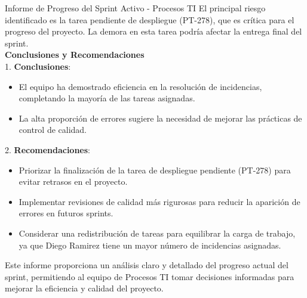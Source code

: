 \documentclass{beamer}
\begin{document}
\begin{frame}{Informe de Progreso del Sprint Activo - Procesos TI}
El principal riesgo identificado es la tarea pendiente de despliegue (PT-278), que es crítica para el progreso del proyecto. La demora en esta tarea podría afectar la entrega final del sprint.\\
\textbf{Conclusiones y Recomendaciones}\\[1ex]
1. \textbf{Conclusiones}:\\
\begin{itemize}
\item El equipo ha demostrado eficiencia en la resolución de incidencias, completando la mayoría de las tareas asignadas.
\item La alta proporción de errores sugiere la necesidad de mejorar las prácticas de control de calidad.
\end{itemize}
2. \textbf{Recomendaciones}:\\
\begin{itemize}
\item Priorizar la finalización de la tarea de despliegue pendiente (PT-278) para evitar retrasos en el proyecto.
\item Implementar revisiones de calidad más rigurosas para reducir la aparición de errores en futuros sprints.
\item Considerar una redistribución de tareas para equilibrar la carga de trabajo, ya que Diego Ramirez tiene un mayor número de incidencias asignadas.
\end{itemize}
Este informe proporciona un análisis claro y detallado del progreso actual del sprint, permitiendo al equipo de Procesos TI tomar decisiones informadas para mejorar la eficiencia y calidad del proyecto.\\
\end{frame}
\end{document}

